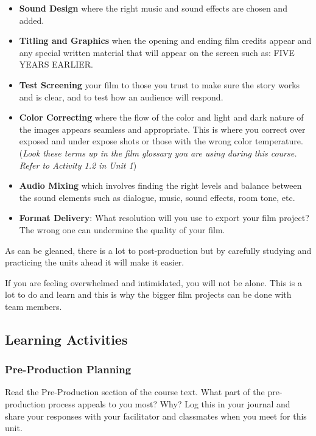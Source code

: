 \documentclass[
]{book}
\begin{document}
\begin{itemize}
\item
  \textbf{Sound Design} where the right music and sound effects are chosen and added.
\item
  \textbf{Titling and Graphics} when the opening and ending film credits appear and any special written material that will appear on the screen such as: FIVE YEARS EARLIER.
\item
  \textbf{Test Screening} your film to those you trust to make sure the story works and is clear, and to test how an audience will respond.
\item
  \textbf{Color Correcting} where the flow of the color and light and dark nature of the images appears seamless and appropriate. This is where you correct over exposed and under expose shots or those with the wrong color temperature. (\emph{Look these terms up in the film glossary you are using during this course. Refer to Activity 1.2 in Unit 1})
\item
  \textbf{Audio Mixing} which involves finding the right levels and balance between the sound elements such as dialogue, music, sound effects, room tone, etc.
\item
  \textbf{Format Delivery}: What resolution will you use to export your film project? The wrong one can undermine the quality of your film.
\end{itemize}

As can be gleaned, there is a lot to post-production but by carefully studying and practicing the units ahead it will make it easier.

If you are feeling overwhelmed and intimidated, you will not be alone. This is a lot to do and learn and this is why the bigger film projects can be done with team members.

\hypertarget{learning-activities-4}{%
\subsection*{Learning Activities}\label{learning-activities-4}}

\hypertarget{pre-production-planning}{%
\subsubsection*{Pre-Production Planning}\label{pre-production-planning}}

Read the Pre-Production section of the course text. What part of the pre-production process appeals to you most? Why? Log this in your journal and share your responses with your facilitator and classmates when you meet for this unit.
\end{document}

